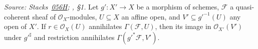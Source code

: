 \begin{lemma}\label{mk-lem:annihilator_pullback_sections}
  \leanok

  \textit{Source:
  Stacks~\href{https://stacks.math.columbia.edu/tag/056H}{056H};
  \cite{nitsure-hilbert-quot}, \S 1.}
  Let \(g' : X' \to X\) be a morphism of schemes, \(\mathcal{F}\) a
  quasi-coherent sheaf of \(\mathcal{O}_X\)-modules, \(U \subseteq X\) an
  affine open, and \(V' \subseteq g'^{-1}(U)\) any open of \(X'\).  If
  \(r \in \mathcal{O}_X(U)\) annihilates \(\Gamma(\mathcal{F}, U)\), then its
  image in \(\mathcal{O}_{X'}(V')\) under \(g'^\sharp\) and restriction
  annihilates \(\Gamma(g'^* \mathcal{F}, V')\).
\end{lemma}
